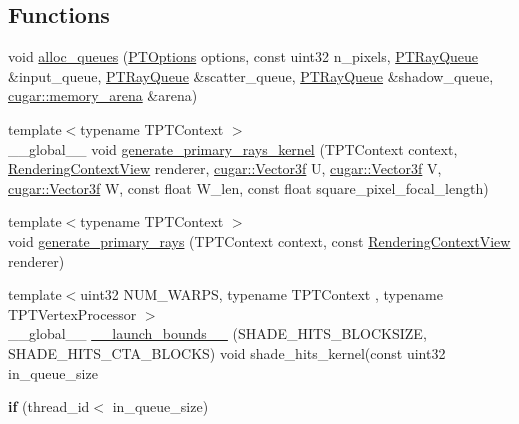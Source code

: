 \subsection*{Functions}
\begin{DoxyCompactItemize}
\item 
void \hyperlink{group___p_t_lib_gaf8daef8b815f7712ff692edbaa628881}{alloc\+\_\+queues} (\hyperlink{struct_p_t_options}{P\+T\+Options} options, const uint32 n\+\_\+pixels, \hyperlink{struct_p_t_ray_queue}{P\+T\+Ray\+Queue} \&input\+\_\+queue, \hyperlink{struct_p_t_ray_queue}{P\+T\+Ray\+Queue} \&scatter\+\_\+queue, \hyperlink{struct_p_t_ray_queue}{P\+T\+Ray\+Queue} \&shadow\+\_\+queue, \hyperlink{structcugar_1_1memory__arena}{cugar\+::memory\+\_\+arena} \&arena)
\item 
{\footnotesize template$<$typename T\+P\+T\+Context $>$ }\\\+\_\+\+\_\+global\+\_\+\+\_\+ void \hyperlink{group___p_t_lib_ga9382084c986a4fe52d55f7f225211e66}{generate\+\_\+primary\+\_\+rays\+\_\+kernel} (T\+P\+T\+Context context, \hyperlink{struct_rendering_context_view}{Rendering\+Context\+View} renderer, \hyperlink{structcugar_1_1_vector}{cugar\+::\+Vector3f} U, \hyperlink{structcugar_1_1_vector}{cugar\+::\+Vector3f} V, \hyperlink{structcugar_1_1_vector}{cugar\+::\+Vector3f} W, const float W\+\_\+len, const float square\+\_\+pixel\+\_\+focal\+\_\+length)
\item 
{\footnotesize template$<$typename T\+P\+T\+Context $>$ }\\void \hyperlink{group___p_t_lib_ga66602a846711dc021ed0b930846ea596}{generate\+\_\+primary\+\_\+rays} (T\+P\+T\+Context context, const \hyperlink{struct_rendering_context_view}{Rendering\+Context\+View} renderer)
\item 
{\footnotesize template$<$uint32 N\+U\+M\+\_\+\+W\+A\+R\+PS, typename T\+P\+T\+Context , typename T\+P\+T\+Vertex\+Processor $>$ }\\\+\_\+\+\_\+global\+\_\+\+\_\+ \hyperlink{group___p_t_lib_ga0a753a84987b59dab9b11e077e72c26b}{\+\_\+\+\_\+launch\+\_\+bounds\+\_\+\+\_\+} (S\+H\+A\+D\+E\+\_\+\+H\+I\+T\+S\+\_\+\+B\+L\+O\+C\+K\+S\+I\+ZE, S\+H\+A\+D\+E\+\_\+\+H\+I\+T\+S\+\_\+\+C\+T\+A\+\_\+\+B\+L\+O\+C\+KS) void shade\+\_\+hits\+\_\+kernel(const uint32 in\+\_\+queue\+\_\+size
\item 
\mbox{\label{group___p_t_lib_gaa3fe68413cea6a5379b5d290ee9dd139}} 
{\bfseries if} (thread\+\_\+id$<$ in\+\_\+queue\+\_\+size)
\item 

\end{DoxyCompactItemize}
